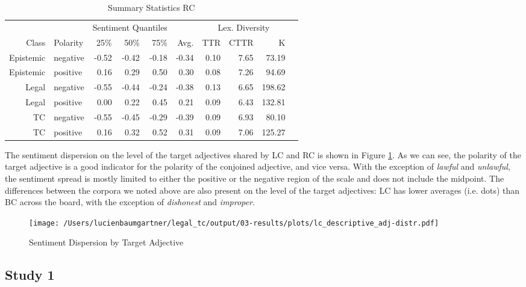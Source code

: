 \documentclass{article}
\begin{document}
\begin{table}[!h]
\centering
{}
\begin{tabular}{rlrrrrrrrr}
  & & \multicolumn{3}{c}{Sentiment Quantiles} & & \multicolumn{3}{c}{Lex. Diversity}\\
   \cmidrule{3-5} \cmidrule{7-9}
  Class & Polarity & 25\% & 50\% & 75\% & Avg. &  TTR & CTTR & K\\
  \bottomrule
Epistemic & negative & -0.52 & -0.42 & -0.18 & -0.34 & 0.10 & 7.65 & 73.19 \\ 
  Epistemic & positive & 0.16 & 0.29 & 0.50 & 0.30 & 0.08 & 7.26 & 94.69 \\ 
  Legal & negative & -0.55 & -0.44 & -0.24 & -0.38 & 0.13 & 6.65 & 198.62 \\ 
  Legal & positive & 0.00 & 0.22 & 0.45 & 0.21 & 0.09 & 6.43 & 132.81 \\ 
  TC & negative & -0.55 & -0.45 & -0.29 & -0.39 & 0.09 & 6.93 & 80.10 \\ 
  TC & positive & 0.16 & 0.32 & 0.52 & 0.31 & 0.09 & 7.06 & 125.27 \\ 
   \hline
\end{tabular}
   \caption{Summary Statistics RC}
   \label{tab:RCstats}
\end{table}

The sentiment dispersion on the level of the target adjectives shared by LC and RC is shown in Figure \ref{fig:SDta}. As we can see, the polarity of the target adjective is a good indicator for the polarity of the conjoined adjective, and vice versa. With the exception of \textit{lawful} and \textit{unlawful}, the sentiment spread is mostly limited to either the positive or the negative region of the scale and does not include the midpoint. The differences between the corpora we noted above are also present on the level of the target adjectives: LC has lower averages (i.e. dots) than BC across the board, with the exception of \textit{dishonest} and \textit{improper}. %

\begin{figure}[!ht]
\center
\texttt{[image: /Users/lucienbaumgartner/legal\_tc/output/03-results/plots/lc\_descriptive\_adj-distr.pdf]}
\caption{Sentiment Dispersion by Target Adjective}
\label{fig:SDta}
\end{figure}


\subsection{Study 1}
\end{document}
